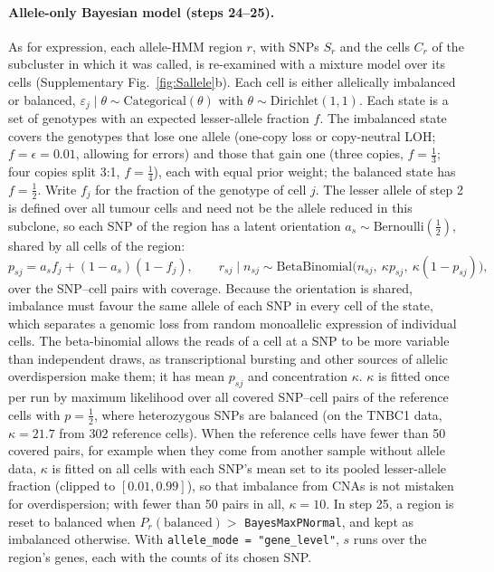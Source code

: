 \paragraph{Allele-only Bayesian model (steps 24--25).}
As for expression, each allele-HMM region $r$, with SNPs $S_r$ and the cells $C_r$ of the subcluster in which it was called, is re-examined with a mixture model over its cells (Supplementary Fig.~\ref{fig:Sallele}b). Each cell is either allelically imbalanced or balanced, $\varepsilon_j\mid\theta\sim\mathrm{Categorical}(\theta)$ with $\theta\sim\mathrm{Dirichlet}(1,1)$. Each state is a set of genotypes with an expected lesser-allele fraction $f$. The imbalanced state covers the genotypes that lose one allele (one-copy loss or copy-neutral LOH; $f=\epsilon=0.01$, allowing for errors) and those that gain one (three copies, $f=\tfrac13$; four copies split 3:1, $f=\tfrac14$), each with equal prior weight; the balanced state has $f=\tfrac12$. Write $f_j$ for the fraction of the genotype of cell $j$. The lesser allele of step 2 is defined over all tumour cells and need not be the allele reduced in this subclone, so each SNP of the region has a latent orientation $a_s\sim\mathrm{Bernoulli}(\tfrac12)$, shared by all cells of the region:
\begin{equation}
p_{sj} = a_s f_j + (1-a_s)(1-f_j),\qquad
r_{sj}\mid n_{sj} \sim \mathrm{BetaBinomial}\big(n_{sj},\ \kappa p_{sj},\ \kappa(1-p_{sj})\big),
\end{equation}
over the SNP--cell pairs with coverage. Because the orientation is shared, imbalance must favour the same allele of each SNP in every cell of the state, which separates a genomic loss from random monoallelic expression of individual cells. The beta-binomial allows the reads of a cell at a SNP to be more variable than independent draws, as transcriptional bursting and other sources of allelic overdispersion make them; it has mean $p_{sj}$ and concentration $\kappa$. $\kappa$ is fitted once per run by maximum likelihood over all covered SNP--cell pairs of the reference cells with $p=\tfrac12$, where heterozygous SNPs are balanced (on the TNBC1 data, $\kappa=21.7$ from 302 reference cells). When the reference cells have fewer than 50 covered pairs, for example when they come from another sample without allele data, $\kappa$ is fitted on all cells with each SNP's mean set to its pooled lesser-allele fraction (clipped to $[0.01, 0.99]$), so that imbalance from CNAs is not mistaken for overdispersion; with fewer than 50 pairs in all, $\kappa=10$. In step 25, a region is reset to balanced when $P_r(\text{balanced})>$ \texttt{BayesMaxPNormal}, and kept as imbalanced otherwise. With \texttt{allele\_mode = "gene\_level"}, $s$ runs over the region's genes, each with the counts of its chosen SNP.


